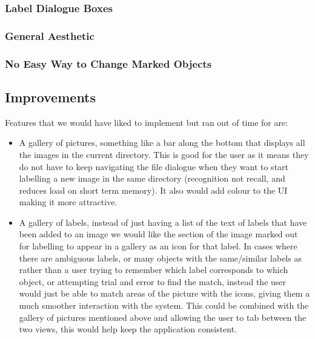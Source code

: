 \documentclass[a4paper,11pt,oneside]{article}
\begin{document}
\subsubsection{Label Dialogue Boxes}
\subsubsection{General Aesthetic}
\subsubsection{No Easy Way to Change Marked Objects}

\subsection{Improvements}
Features that we would have liked to implement but ran out of time for are:
\begin{itemize}
\item A gallery of pictures, something like a bar along the bottom that displays all the images in the current directory.  This is good for the user as it means they do not have to keep navigating the file dialogue when they want to start labelling a new image in the same directory (recognition not recall, and reduces load on short term memory).  It also would add colour to the UI making it more attractive.
\item A gallery of labels, instead of just having a list of the text of labels that have been added to an image we would like the section of the image marked out for labelling to appear in a gallery as an icon for that label.  In cases where there are ambiguous labels, or many objects with the same/similar labels as rather than a user trying to remember which label corresponds to which object, or attempting trial and error to find the match, instead the user would just be able to match areas of the picture with the icons, giving them a much smoother interaction with the system.  This could be combined with the gallery of pictures mentioned above and allowing the user to tab between the two views, this would help keep the application consistent.
\end{itemize}
\end{document}
